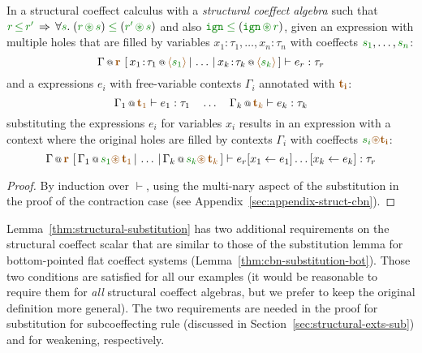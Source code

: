 \begin{lemma}
\label{thm:structural-substitution}
In a structural coeffect calculus with a \emph{structural coeffect algebra} such that
$\cclrd{r}\,\cleq\,\cclrd{r'} \, \Rightarrow \, \forall\cclrd{s}.\;(\cclrd{r}\,\cseq\,\cclrd{s})\;\cleq\;(\cclrd{r'}\,\cseq\,\cclrd{s})$
and also $\czero \;\cleq\; (\czero\,\cseq\,\cclrd{r})$,
given an expression with multiple holes that are filled by variables $x_1\!:\!\tau_1,\ldots,x_n\!:\!\tau_n$ with coeffects $\cclrd{s_1},\ldots,\cclrd{s_n}$:
%
\begin{equation*}
\coctx{\Gamma}{\aclrd{\textbf{r}}}~[\,\coctx{x_1\!:\!\tau_1}{\alift{\cclrd{s_1}}} \,|\, \ldots \,|\,
  \coctx{x_k\!:\!\tau_k}{\alift{\cclrd{s_k}}}\,] \vdash e_r : \tau_r
\end{equation*}
%
and a expressions $e_i$ with free-variable contexts $\Gamma_i$ annotated with $\aclrd{\mathbf{t_i}}$:
%
\begin{equation*}
\coctx{\Gamma_1}{\aclrd{\textbf{t}_1}} \vdash e_1 : \tau_1
\quad \ldots \quad
\coctx{\Gamma_k}{\aclrd{\textbf{t}_k}} \vdash e_k : \tau_k
\end{equation*}
%
substituting the expressions $e_i$ for variables $x_i$ results in an expression with a context
where the original holes are filled by contexts $\Gamma_i$ with coeffects $\cclrd{s_i} \aseq \aclrd{\mathbf{t_i}}$:
%
\begin{equation*}
\coctx{\Gamma}{\aclrd{\textbf{r}}}~[\,\coctx{\Gamma_1}{\cclrd{s_1}\aseq\,\aclrd{\textbf{t}_1}} \,|\, \ldots \,|\,
  \coctx{\Gamma_k}{\cclrd{s_k}\aseq\,\aclrd{\textbf{t}_k}}\,] \vdash \subst{\subst{e_r}{x_1}{e_1}\ldots}{x_k}{e_k} : \tau_r
\end{equation*}
\end{lemma}
\begin{proof}
By induction over $\vdash$, using the multi-nary aspect of the substitution
in the proof of the contraction case (see Appendix~\ref{sec:appendix-struct-cbn}).
\end{proof}

Lemma~\ref{thm:structural-substitution} has two additional requirements on the structural coeffect
scalar that are similar to those of the substitution lemma for bottom-pointed flat coeffect systems
(Lemma~\ref{thm:cbn-substitution-bot}). Those two conditions are satisfied for all our examples
(it would be reasonable to require them for \emph{all} structural coeffect algebras, but we prefer
to keep the original definition more general). The two requirements are needed in the proof
for substitution for subcoeffecting rule (discussed in Section~\ref{sec:structural-exts-sub}) and
for weakening, respectively.

